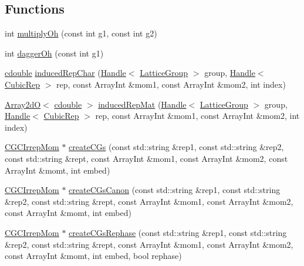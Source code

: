 \subsection*{Functions}
\begin{DoxyCompactItemize}
\item 
int \mbox{\hyperlink{namespaceHadron_1_1CGC_a16432200edf54430116d5593f2f755d6}{multiply\+Oh}} (const int g1, const int g2)
\item 
int \mbox{\hyperlink{namespaceHadron_1_1CGC_a90d3161b56ca289f2c3f62fa91923dac}{dagger\+Oh}} (const int g1)
\item 
\mbox{\hyperlink{namespaceHadron_1_1CGC_a52d2b70e6792726fb525eab94daae53b}{cdouble}} \mbox{\hyperlink{namespaceHadron_1_1CGC_a6508b0e362ceb9df82bdd26575736fc6}{induced\+Rep\+Char}} (\mbox{\hyperlink{classADAT_1_1Handle}{Handle}}$<$ \mbox{\hyperlink{structHadron_1_1LatticeGroup}{Lattice\+Group}} $>$ group, \mbox{\hyperlink{classADAT_1_1Handle}{Handle}}$<$ \mbox{\hyperlink{structHadron_1_1CubicRep}{Cubic\+Rep}} $>$ rep, const Array\+Int \&mom1, const Array\+Int \&mom2, int index)
\item 
\mbox{\hyperlink{classADAT_1_1Array2dO}{Array2dO}}$<$ \mbox{\hyperlink{namespaceHadron_1_1CGC_a52d2b70e6792726fb525eab94daae53b}{cdouble}} $>$ \mbox{\hyperlink{namespaceHadron_1_1CGC_aa7e28e013e98896d3053e95ce419f31e}{induced\+Rep\+Mat}} (\mbox{\hyperlink{classADAT_1_1Handle}{Handle}}$<$ \mbox{\hyperlink{structHadron_1_1LatticeGroup}{Lattice\+Group}} $>$ group, \mbox{\hyperlink{classADAT_1_1Handle}{Handle}}$<$ \mbox{\hyperlink{structHadron_1_1CubicRep}{Cubic\+Rep}} $>$ rep, const Array\+Int \&mom1, const Array\+Int \&mom2, int index)
\item 
\mbox{\hyperlink{classHadron_1_1CGCIrrepMom}{C\+G\+C\+Irrep\+Mom}} $\ast$ \mbox{\hyperlink{namespaceHadron_1_1CGC_a3a95d08c25d8f09a43db0baca8c13e6f}{create\+C\+Gs}} (const std\+::string \&rep1, const std\+::string \&rep2, const std\+::string \&rept, const Array\+Int \&mom1, const Array\+Int \&mom2, const Array\+Int \&momt, int embed)
\item 
\mbox{\hyperlink{classHadron_1_1CGCIrrepMom}{C\+G\+C\+Irrep\+Mom}} $\ast$ \mbox{\hyperlink{namespaceHadron_1_1CGC_a416e4eef9b4975ce970e2e0ff04a09e6}{create\+C\+Gs\+Canon}} (const std\+::string \&rep1, const std\+::string \&rep2, const std\+::string \&rept, const Array\+Int \&mom1, const Array\+Int \&mom2, const Array\+Int \&momt, int embed)
\item 
\mbox{\hyperlink{classHadron_1_1CGCIrrepMom}{C\+G\+C\+Irrep\+Mom}} $\ast$ \mbox{\hyperlink{namespaceHadron_1_1CGC_acb590dcbf6bd9f515f07a8e64aa76c0b}{create\+C\+Gs\+Rephase}} (const std\+::string \&rep1, const std\+::string \&rep2, const std\+::string \&rept, const Array\+Int \&mom1, const Array\+Int \&mom2, const Array\+Int \&momt, int embed, bool rephase)

\end{DoxyCompactItemize}
